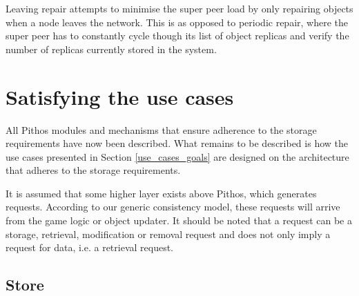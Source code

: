 Leaving repair attempts to minimise the super peer load by only repairing objects when a node leaves the network. This is as opposed to periodic repair, where the super peer has to constantly cycle though its list of object replicas and verify the number of replicas currently stored in the system.

\section{Satisfying the use cases}
All Pithos modules and mechanisms that ensure adherence to the storage requirements have now been described. What remains to be described is how the use cases presented in Section \ref{use_cases_goals} are designed on the architecture that adheres to the storage requirements.

It is assumed that some higher layer exists above Pithos, which generates requests. According to our generic consistency model, these requests will arrive from the game logic or object updater. It should be noted that a request can be a storage, retrieval, modification or removal request and does not only imply a request for data, i.e. a retrieval request.

\subsection{Store}
\label{pithos_store}

